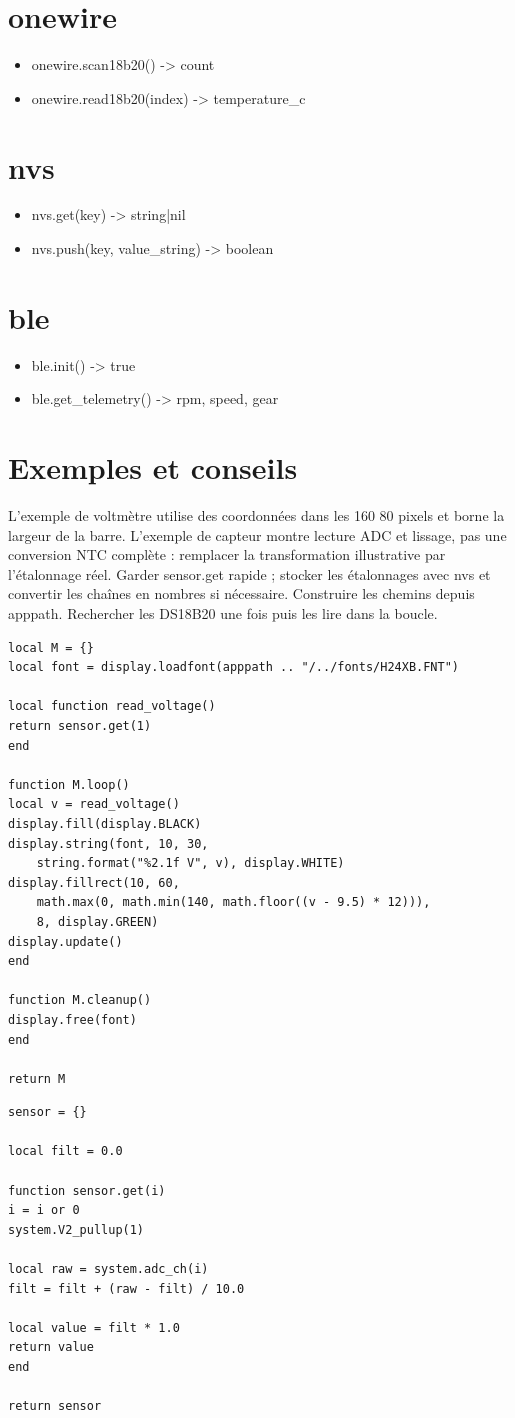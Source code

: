 \section{onewire}
\begin{itemize}
\item onewire.scan18b20() -> count
\item onewire.read18b20(index) -> temperature\_c
\end{itemize}
\section{nvs}
\begin{itemize}
\item nvs.get(key) -> string|nil
\item nvs.push(key, value\_string) -> boolean
\end{itemize}
\section{ble}
\begin{itemize}
\item ble.init() -> true
\item ble.get\_telemetry() -> rpm, speed, gear
\end{itemize}
\section{Exemples et conseils}
L'exemple de voltmètre utilise des coordonnées dans les 160\,\texttimes\,80 pixels et borne la largeur de la barre. L'exemple de capteur montre lecture ADC et lissage, pas une conversion NTC complète : remplacer la transformation illustrative par l'étalonnage réel. Garder sensor.get rapide ; stocker les étalonnages avec nvs et convertir les chaînes en nombres si nécessaire. Construire les chemins depuis apppath. Rechercher les DS18B20 une fois puis les lire dans la boucle.
\begin{verbatim}
local M = {}
local font = display.loadfont(apppath .. "/../fonts/H24XB.FNT")

local function read_voltage()
return sensor.get(1)
end

function M.loop()
local v = read_voltage()
display.fill(display.BLACK)
display.string(font, 10, 30,
    string.format("%2.1f V", v), display.WHITE)
display.fillrect(10, 60,
    math.max(0, math.min(140, math.floor((v - 9.5) * 12))),
    8, display.GREEN)
display.update()
end

function M.cleanup()
display.free(font)
end

return M
\end{verbatim}
\begin{verbatim}
sensor = {}

local filt = 0.0

function sensor.get(i)
i = i or 0
system.V2_pullup(1)

local raw = system.adc_ch(i)
filt = filt + (raw - filt) / 10.0

local value = filt * 1.0
return value
end

return sensor
\end{verbatim}
